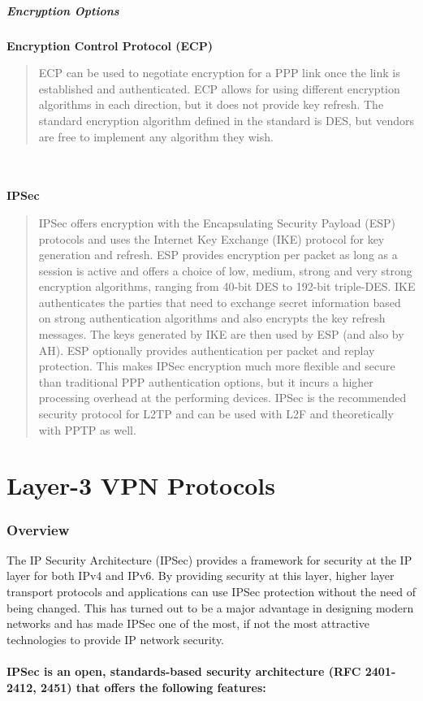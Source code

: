 \documentclass[10pt,a4paper]{article}
\begin{document}
\begin{itemize}
\begin{itemize}
\subsubsection{Encryption Options}

\textbf{Encryption Control Protocol (ECP)}
\begin{quote}
ECP can be used to negotiate encryption for a PPP link once the link is
established and authenticated. ECP allows for using different encryption
algorithms in each direction, but it does not provide key refresh. The standard
encryption algorithm defined in the standard is DES, but vendors are free to
implement any algorithm they wish.
\end{quote}
\\
\\
\textbf{IPSec}
\begin{quote}
IPSec offers encryption with the Encapsulating Security Payload (ESP) protocols
and uses the Internet Key Exchange (IKE) protocol for key generation and
refresh. ESP provides encryption per packet as long as a session is active and
offers a choice of low, medium, strong and very strong encryption algorithms,
ranging from 40-bit DES to 192-bit triple-DES. IKE authenticates the parties that
need to exchange secret information based on strong authentication algorithms
and also encrypts the key refresh messages. The keys generated by IKE are then
used by ESP (and also by AH). ESP optionally provides authentication per packet
and replay protection. This makes IPSec encryption much more flexible and
secure than traditional PPP authentication options, but it incurs a higher
processing overhead at the performing devices. IPSec is the recommended
security protocol for L2TP and can be used with L2F and theoretically with PPTP
as well.
\end{quote}


\newpage
\part{Layer-3 VPN Protocols}

\section{Overview}
The IP Security Architecture (IPSec) provides a framework for security at the IP
layer for both IPv4 and IPv6. By providing security at this layer, higher layer
transport protocols and applications can use IPSec protection without the need of
being changed. This has turned out to be a major advantage in designing modern
networks and has made IPSec one of the most, if not the most attractive
technologies to provide IP network security.
\\
\\
\textbf{IPSec is an open, standards-based security architecture (RFC 2401-2412, 2451)
that offers the following features:}


\end{itemize}
\end{itemize}
\end{document}
